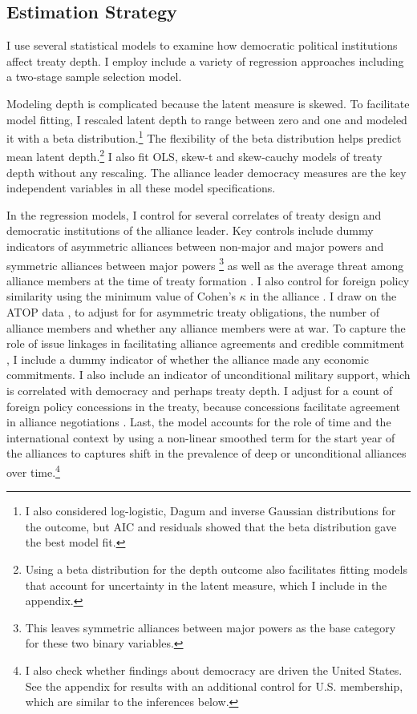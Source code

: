 \documentclass[12pt]{article}
\begin{document}
\subsection{Estimation Strategy}



I use several statistical models to examine how democratic political institutions affect treaty depth.
I employ include a variety of regression approaches including a two-stage sample selection model. 

Modeling depth is complicated because the latent measure is skewed.
To facilitate model fitting, I rescaled latent depth to range between zero and one and modeled it with a beta distribution.\footnote{I also considered log-logistic, Dagum and inverse Gaussian distributions for the outcome, but AIC and residuals showed that the beta distribution gave the best model fit.}
The flexibility of the beta distribution helps predict mean latent depth.\footnote{Using a beta distribution for the depth outcome also facilitates fitting models that account for uncertainty in the latent measure, which I include in the appendix.} 
I also fit OLS, skew-t and skew-cauchy models of treaty depth without any rescaling.
The alliance leader democracy measures are the key independent variables in all these model specifications. 


In the regression models, I control for several correlates of treaty design and democratic institutions of the alliance leader. 
Key controls include dummy indicators of asymmetric alliances between non-major and major powers and symmetric alliances between major powers \citep{Mattes2012}\footnote{This leaves symmetric alliances between major powers as the base category for these two binary variables.} as well as the average threat among alliance members at the time of treaty formation \citep{LeedsSavun2007}. 
I also control for foreign policy similarity using the minimum value of Cohen's $\kappa$ in the alliance \citep{Hage2011}.
I draw on the ATOP data \citep{Leedsetal2002}, to adjust for for asymmetric treaty obligations, the number of alliance members and whether any alliance members were at war. 
To capture the role of issue linkages in facilitating alliance agreements and credible commitment \citep{Poast2012, Poast2013}, I include a dummy indicator of whether the alliance made any economic commitments. 
I also include an indicator of unconditional military support, which is correlated with democracy \citep{Chibaetal2015} and perhaps treaty depth. 
I adjust for a count of foreign policy concessions in the treaty, because concessions facilitate agreement in alliance negotiations \citep{Johnson2015}. 
Last, the model accounts for the role of time and the international context by using a non-linear smoothed term for the start year of the alliances to captures shift in the prevalence of deep or unconditional alliances over time.\footnote{I also check whether findings about democracy are driven the United States. See the appendix for results with an additional control for U.S. membership, which are similar to the inferences below.}
\end{document}
